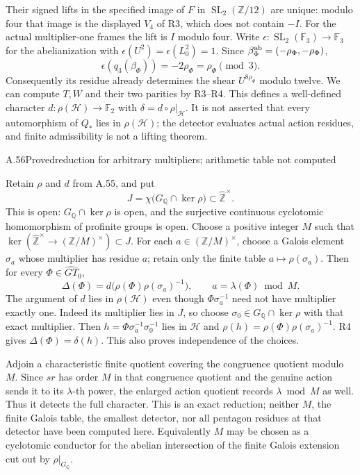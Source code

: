 Their signed lifts in the specified image of $F$ in
$\operatorname{SL}_2(\mathbb Z/12)$ are unique: modulo four that image
is the displayed $V_4$ of R3, which does not contain $-I$.
For the actual multiplier-one frames the lift is $I$ modulo four.
Write $\epsilon:\operatorname{SL}_2(\mathbb F_3)\to\mathbb F_3$
for the abelianization with $\epsilon(U^2)=\epsilon(L_0^2)=1$.
Since $\beta_\Phi^{\rm ab}=(-\rho_\Phi,-\rho_\Phi)$,
\[
 \epsilon(q_3(\beta_\Phi))=-2\rho_\Phi=\rho_\Phi\pmod3.
\]
Consequently its residue already determines the shear $U^{8\rho_\Phi}$
modulo twelve. We can compute $T,W$ and their two parities by R3--R4.
This defines a well-defined character
$d:\rho(\mathcal H)\to\mathbb F_2$ with
$\delta=d\circ\rho|_{\mathcal H}$.
It is not asserted that every automorphism of $Q_*$ lies in
$\rho(\mathcal H)$; the detector evaluates actual action residues,
and finite admissibility is not a lifting theorem.

\begin{statement}{A.56}{Proved}{reduction for arbitrary multipliers; arithmetic table not computed}
\end{statement}
Retain $\rho$ and $d$ from A.55, and put
\[
 J=\chi\bigl(G_{\mathbb Q}\cap\ker\rho\bigr)
       \subset\widehat{\mathbb Z}^{\times}.
\]
This is open: $G_{\mathbb Q}\cap\ker\rho$ is open, and the surjective
continuous cyclotomic homomorphism of profinite groups is open.
Choose a positive integer $M$ such that
$\ker(\widehat{\mathbb Z}^{\times}\to(\mathbb Z/M)^\times)\subset J$.
For each $a\in(\mathbb Z/M)^\times$, choose a Galois element $\sigma_a$
whose multiplier has residue $a$; retain only the finite table
$a\mapsto\rho(\sigma_a)$. Then for every
$\Phi\in\widehat{GT}_0$,
\[
 \Delta(\Phi)=d\bigl(\rho(\Phi)\rho(\sigma_a)^{-1}\bigr),
 \qquad a=\lambda(\Phi)\bmod M.
\]
The argument of $d$ lies in $\rho(\mathcal H)$ even though
$\Phi\sigma_a^{-1}$ need not have multiplier exactly one.
Indeed its multiplier lies in $J$, so choose
$\sigma_0\in G_{\mathbb Q}\cap\ker\rho$ with that exact multiplier.
Then $h=\Phi\sigma_a^{-1}\sigma_0^{-1}$ lies in $\mathcal H$ and
$\rho(h)=\rho(\Phi)\rho(\sigma_a)^{-1}$. R4 gives
$\Delta(\Phi)=\delta(h)$. This also proves independence of the choices.

Adjoin a characteristic finite quotient covering the congruence quotient
modulo $M$. Since $sr$ has order $M$ in that congruence quotient and the
genuine action sends it to its $\lambda$-th power, the enlarged action
quotient records $\lambda\bmod M$ as well. Thus it detects the full
character. This is an exact reduction; neither $M$, the finite Galois
table, the smallest detector, nor all pentagon residues at that detector
have been computed here. Equivalently $M$ may be chosen as a cyclotomic
conductor for the abelian intersection of the finite Galois extension
cut out by $\rho|_{G_{\mathbb Q}}$.

